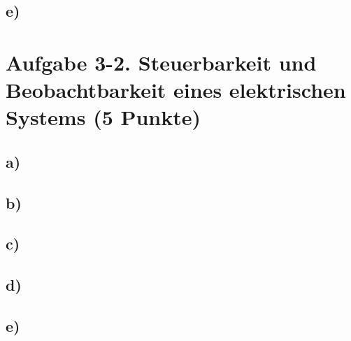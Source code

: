 \documentclass[11pt]{scrartcl} %
\begin{document}
\subsection*{e)}


\section*{Aufgabe 3-2. Steuerbarkeit und Beobachtbarkeit eines elektrischen Systems (5 Punkte)}
\subsection*{a)}
\subsection*{b)}
\subsection*{c)}
\subsection*{d)}
\subsection*{e)}
\end{document}
